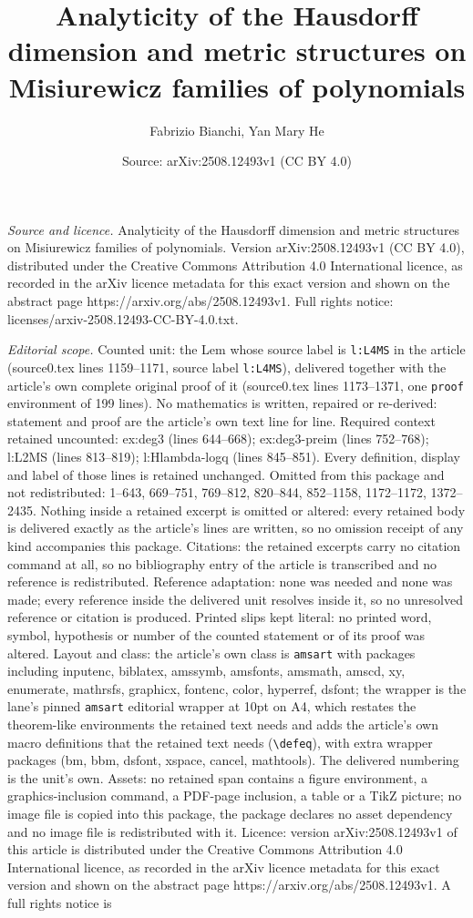 \documentclass[10pt,a4paper]{amsart}
\title[Analyticity of the Hausdorff dimension and metric structures]{Analyticity of the Hausdorff dimension and metric structures on Misiurewicz families of polynomials}
\author{Fabrizio Bianchi, Yan Mary He}
\date{Source: arXiv:2508.12493v1 (CC BY 4.0)}
\begin{document}
\maketitle

\noindent\emph{Source and licence.} Analyticity of the Hausdorff dimension and metric structures on Misiurewicz families of polynomials. Version arXiv:2508.12493v1 (CC BY 4.0), distributed under the Creative Commons Attribution 4.0 International licence, as recorded in the arXiv licence metadata for this exact version and shown on the abstract page https://arxiv.org/abs/2508.12493v1. Full rights notice: licenses/arxiv-2508.12493-CC-BY-4.0.txt.\par\smallskip

\noindent\textit{Editorial scope.} Counted unit: the Lem whose source label is \texttt{l:L4MS} in the article (source0.tex lines 1159--1171, source label \texttt{l:L4MS}), delivered together with the article's own complete original proof of it (source0.tex lines 1173--1371, one \texttt{proof} environment of 199 lines). No mathematics is written, repaired or re-derived: statement and proof are the article's own text line for line. Required context retained uncounted: ex:deg3 (lines 644--668); ex:deg3-preim (lines 752--768); l:L2MS (lines 813--819); l:Hlambda-logq (lines 845--851). Every definition, display and label of those lines is retained unchanged. Omitted from this package and not redistributed: 1--643, 669--751, 769--812, 820--844, 852--1158, 1172--1172, 1372--2435. Nothing inside a retained excerpt is omitted or altered: every retained body is delivered exactly as the article's lines are written, so no omission receipt of any kind accompanies this package. Citations: the retained excerpts carry no citation command at all, so no bibliography entry of the article is transcribed and no reference is redistributed. Reference adaptation: none was needed and none was made; every reference inside the delivered unit resolves inside it, so no unresolved reference or citation is produced. Printed slips kept literal: no printed word, symbol, hypothesis or number of the counted statement or of its proof was altered. Layout and class: the article's own class is \texttt{amsart} with packages including inputenc, biblatex, amssymb, amsfonts, amsmath, amscd, xy, enumerate, mathrsfs, graphicx, fontenc, color, hyperref, dsfont; the wrapper is the lane's pinned \texttt{amsart} editorial wrapper at 10pt on A4, which restates the theorem-like environments the retained text needs and adds the article's own macro definitions that the retained text needs (\texttt{\textbackslash defeq}), with extra wrapper packages (bm, bbm, dsfont, xspace, cancel, mathtools). The delivered numbering is the unit's own. Assets: no retained span contains a figure environment, a graphics-inclusion command, a PDF-page inclusion, a table or a TikZ picture; no image file is copied into this package, the package declares no asset dependency and no image file is redistributed with it. Licence: version arXiv:2508.12493v1 of this article is distributed under the Creative Commons Attribution 4.0 International licence, as recorded in the arXiv licence metadata for this exact version and shown on the abstract page https://arxiv.org/abs/2508.12493v1. A full rights notice is 
\end{document}
